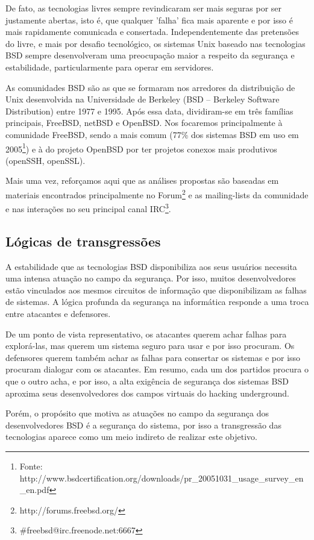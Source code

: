 De fato, as tecnologias livres sempre revindicaram ser mais seguras por ser justamente abertas, isto é, que qualquer 'falha' fica mais aparente e por isso é mais rapidamente comunicada e consertada. Independentemente das pretensões do livre, e mais por desafio tecnológico, os sistemas Unix baseado nas tecnologias BSD sempre desenvolveram uma preocupação maior a respeito da segurança e estabilidade, particularmente para operar em servidores.

As comunidades BSD são as que se formaram nos arredores da distribuição de Unix desenvolvida na Universidade de Berkeley (BSD – Berkeley Software Distribution) entre 1977 e 1995. Após essa data, dividiram-se em três famílias principais, FreeBSD, netBSD e OpenBSD. Nos focaremos principalmente à comunidade FreeBSD, sendo a mais comum (77\% dos sistemas BSD em uso em 2005\footnote{Fonte: http://www.bsdcertification.org/downloads/pr\_20051031\_usage\_survey\_en\_en.pdf}) e à do projeto OpenBSD por ter projetos conexos mais produtivos (openSSH, openSSL).

Mais uma vez, reforçamos aqui que as análises propostas são baseadas em materiais encontrados principalmente no Forum\footnote{http://forums.freebsd.org/} e as mailing-lists da comunidade e nas interações no seu principal canal IRC\footnote{\#freebsd@irc.freenode.net:6667}.

\subsection{Lógicas de transgressões} \label{3.4.1}

A estabilidade que as tecnologias BSD disponibiliza aos seus usuários necessita  uma intensa atuação no campo da segurança. Por isso, muitos desenvolvedores estão vinculados aos mesmos circuitos de informação que disponibilizam as falhas de sistemas. A lógica profunda da segurança na informática responde a uma troca entre atacantes e defensores.

De um ponto de vista representativo, os atacantes querem achar falhas para explorá-las, mas querem um sistema seguro para usar e por isso procuram. Os defensores querem também achar as falhas para consertar os sistemas e por isso procuram dialogar com os atacantes. Em resumo, cada um dos partidos procura o que o outro acha, e por isso, a alta exigência de segurança dos sistemas BSD aproxima seus desenvolvedores dos campos virtuais do hacking underground.

Porém, o propósito que motiva as atuações no campo da segurança dos desenvolvedores BSD é a segurança do sistema, por isso a transgressão das tecnologias aparece como um meio indireto de realizar este objetivo.

